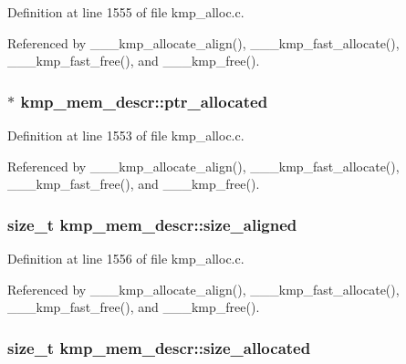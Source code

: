 Definition at line 1555 of file kmp\-\_\-alloc.\-c.



Referenced by \-\_\-\-\_\-\-\_\-kmp\-\_\-allocate\-\_\-align(), \-\_\-\-\_\-\-\_\-kmp\-\_\-fast\-\_\-allocate(), \-\_\-\-\_\-\-\_\-kmp\-\_\-fast\-\_\-free(), and \-\_\-\-\_\-\-\_\-kmp\-\_\-free().

\hypertarget{structkmp__mem__descr_ad2113fb51705dca6a3f4b35a7842b1e6}{
\subsubsection[{ptr\-\_\-allocated}]{$\ast$ kmp\-\_\-mem\-\_\-descr\-::ptr\-\_\-allocated}}\label{structkmp__mem__descr_ad2113fb51705dca6a3f4b35a7842b1e6}


Definition at line 1553 of file kmp\-\_\-alloc.\-c.



Referenced by \-\_\-\-\_\-\-\_\-kmp\-\_\-allocate\-\_\-align(), \-\_\-\-\_\-\-\_\-kmp\-\_\-fast\-\_\-allocate(), \-\_\-\-\_\-\-\_\-kmp\-\_\-fast\-\_\-free(), and \-\_\-\-\_\-\-\_\-kmp\-\_\-free().

\hypertarget{structkmp__mem__descr_a6050e2806a19c46a0df4418f4df57f9d}{
\subsubsection[{size\-\_\-aligned}]{\setlength{\rightskip}{0pt plus 5cm}size\-\_\-t kmp\-\_\-mem\-\_\-descr\-::size\-\_\-aligned}}\label{structkmp__mem__descr_a6050e2806a19c46a0df4418f4df57f9d}


Definition at line 1556 of file kmp\-\_\-alloc.\-c.



Referenced by \-\_\-\-\_\-\-\_\-kmp\-\_\-allocate\-\_\-align(), \-\_\-\-\_\-\-\_\-kmp\-\_\-fast\-\_\-allocate(), \-\_\-\-\_\-\-\_\-kmp\-\_\-fast\-\_\-free(), and \-\_\-\-\_\-\-\_\-kmp\-\_\-free().

\hypertarget{structkmp__mem__descr_adaf988fb85d121839a32ce016312ba34}{
\subsubsection[{size\-\_\-allocated}]{\setlength{\rightskip}{0pt plus 5cm}size\-\_\-t kmp\-\_\-mem\-\_\-descr\-::size\-\_\-allocated}}\label{structkmp__mem__descr_adaf988fb85d121839a32ce016312ba34}


